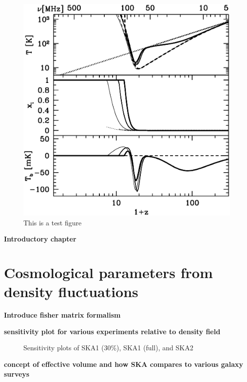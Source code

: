 \documentclass{PoS}
\begin{document}
\begin{figure}[htbp]
\begin{center}
\includegraphics[scale=0.3]{figures/global_signal.eps}
\caption{This is a test figure}
\label{fig:global_signal}
\end{center}
\end{figure}

{\bf Introductory chapter}


\section{Cosmological parameters from density fluctuations}

{\bf Introduce fisher matrix formalism}

{\bf sensitivity plot for various experiments relative to density field}

\begin{figure}[htbp]
\begin{center}

\caption{Sensitivity plots of SKA1 (30\%), SKA1 (full), and SKA2}
\label{fig:sensitivity}
\end{center}
\end{figure}

{\bf concept of effective volume and how SKA compares to various galaxy surveys}
\end{document}
